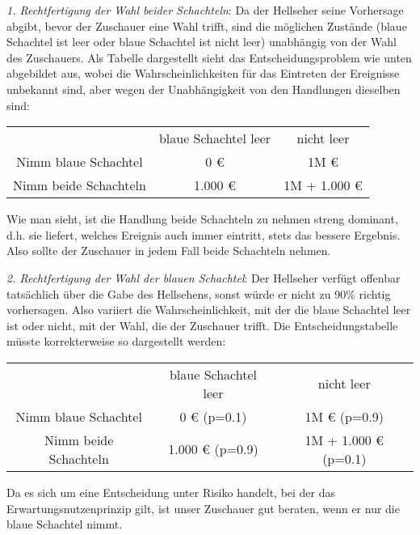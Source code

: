 {\em 1. Rechtfertigung der Wahl beider Schachteln}: Da der Hellseher seine
Vorhersage abgibt, bevor der Zuschauer eine Wahl trifft, sind die möglichen
Zustände (blaue Schachtel ist leer oder blaue Schachtel ist nicht leer)
unabhängig von der Wahl des Zuschauers. 
Als Tabelle dargestellt sieht das Entscheidungsproblem wie unten abgebildet aus,
wobei die Wahrscheinlichkeiten für das Eintreten der Ereignisse unbekannt sind,
aber wegen der Unabhängigkeit von den Handlungen dieselben sind:
\begin{center}
\begin{tabular}{c|c|c|}
\multicolumn{1}{c}{}   & \multicolumn{1}{c}{blaue Schachtel leer}   
                       & \multicolumn{1}{c}{nicht leer} \\ \cline{2-3} 
Nimm blaue Schachtel   &    0 €                 & 1M € \\ \cline{2-3} 
Nimm beide Schachteln  & 1.000 €                & 1M + 1.000 € \\ \cline{2-3}
\end{tabular}
\end{center}
Wie man sieht, ist die Handlung beide Schachteln zu nehmen streng dominant,
d.h. sie liefert, welches Ereignis auch immer eintritt, stets das bessere
Ergebnis. Also sollte der Zuschauer in jedem Fall beide Schachteln nehmen.

{\em 2. Rechtfertigung der Wahl der blauen Schachtel}: Der Hellseher verfügt
offenbar tatsächlich über die Gabe des Hellsehens, sonst würde er nicht zu 90\%
richtig vorhersagen. Also variiert die Wahrscheinlichkeit, mit der die blaue
Schachtel leer ist oder nicht, mit der Wahl, die der Zuschauer trifft. 
Die Entscheidungstabelle müsste korrekterweise so dargestellt werden:

\begin{center}
\begin{tabular}{c|c|c|}
\multicolumn{1}{c}{}   & \multicolumn{1}{c}{blaue Schachtel leer}   
                       & \multicolumn{1}{c}{nicht leer} \\ \cline{2-3} 
Nimm blaue Schachtel   &    0 € (p=0.1)         & 1M € (p=0.9) \\ \cline{2-3} 
Nimm beide Schachteln  & 1.000 € (p=0.9)        & 1M + 1.000 € (p=0.1)
\\ \cline{2-3}
\end{tabular}
\end{center}
Da es sich um eine Entscheidung unter Risiko handelt, bei der das
Erwartungsnutzenprinzip gilt, ist unser Zuschauer gut beraten, wenn er nur die
blaue Schachtel nimmt.

